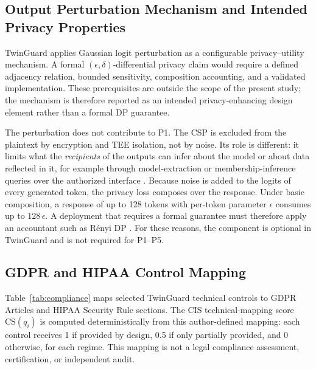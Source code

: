 \documentclass{ieeeaccess}
\begin{document}
\subsection{Output Perturbation Mechanism and Intended Privacy Properties}

TwinGuard applies Gaussian logit perturbation as a configurable
privacy--utility mechanism. A formal $(\epsilon,\delta)$-differential privacy
claim would require a defined adjacency relation, bounded sensitivity,
composition accounting, and a validated implementation. These prerequisites
are outside the scope of the present study; the mechanism is therefore
reported as an intended privacy-enhancing design element rather than a formal
DP guarantee.

The perturbation does not contribute to P1. The CSP is excluded from the
plaintext by encryption and TEE isolation, not by noise. Its role is
different: it limits what the \emph{recipients} of the outputs can infer about
the model or about data reflected in it, for example through model-extraction
or membership-inference queries over the authorized interface
\cite{carlini2024stealing}. Because noise is added to the logits of every
generated token, the privacy loss composes over the response. Under basic
composition, a response of up to 128 tokens with per-token parameter
$\epsilon$ consumes up to $128\,\epsilon$. A deployment that requires a formal
guarantee must therefore apply an accountant such as R\'enyi DP
\cite{mironov2017renyi}. For these reasons, the component is optional in
TwinGuard and is not required for P1--P5.

\subsection{GDPR and HIPAA Control Mapping}

Table~\ref{tab:compliance} maps selected TwinGuard technical controls to
GDPR Articles and HIPAA Security Rule sections. The CIS technical-mapping
score $\mathrm{CS}(q_i)$ is computed deterministically from this
author-defined mapping: each control receives 1 if provided by design, 0.5 if
only partially provided, and 0 otherwise, for each regime. This mapping is not a legal compliance assessment,
certification, or independent audit.
\end{document}
